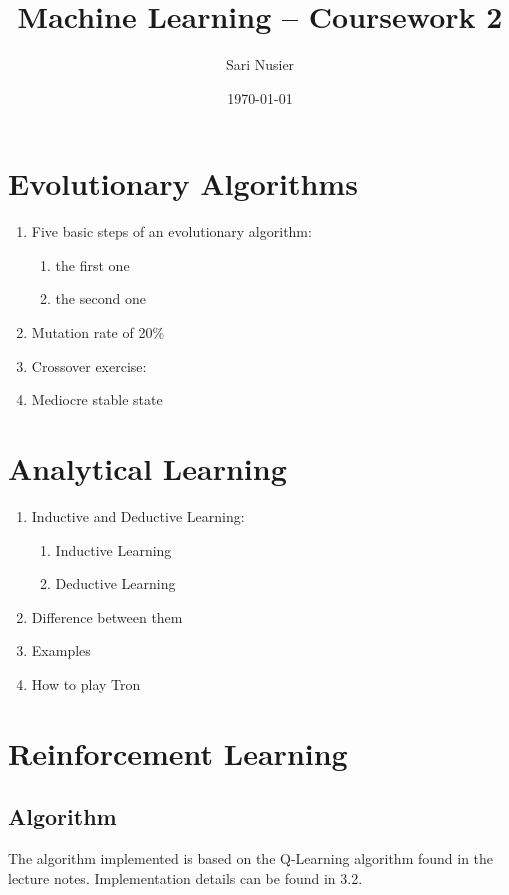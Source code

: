 \documentclass[12pt,a4paper]{article}
\begin{document}
\begin{titlepage}
	\centering
	\title{Machine Learning -- Coursework 2}
	\author{Sari Nusier}
	\date{\today}
	\maketitle
\end{titlepage}


\section{Evolutionary Algorithms}
	\begin{enumerate}[label=(\alph*)]
		\item Five basic steps of an evolutionary algorithm:
			\begin{enumerate}[label=\roman*.]
				\item the first one
				\item the second one
			\end{enumerate}
		\item Mutation rate of 20\%
		
		\item Crossover exercise:
		
		\item Mediocre stable state
	\end{enumerate}

\section{Analytical Learning}
	\begin{enumerate}[label=(\alph*)]
		\item Inductive and Deductive Learning:
			\begin{enumerate}[label=\roman*.]
				\item Inductive Learning
				\item Deductive Learning
			\end{enumerate}
		\item Difference between them
		\item Examples
		\item How to play Tron
	\end{enumerate}

\section{Reinforcement Learning}
	\subsection{Algorithm}
The algorithm implemented is based on the Q-Learning algorithm found in the lecture notes. Implementation details can be found in 3.2.
\end{document}
